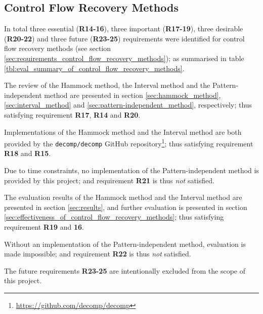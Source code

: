 
\subsection{Control Flow Recovery Methods}

In total three essential (\textbf{R14-16}), three important (\textbf{R17-19}), three desirable (\textbf{R20-22}) and three future (\textbf{R23-25}) requirements were identified for control flow recovery methods (see section \ref{sec:requirements_control_flow_recovery_methods}); as summarised in table \ref{tbl:eval_summary_of_control_flow_recovery_methods}.

The review of the Hammock method, the Interval method and the Pattern-independent method are presented in section \ref{sec:hammock_method}, \ref{sec:interval_method} and \ref{sec:pattern-independent_method}, respectively; thus satisfying requirement \textbf{R17}, \textbf{R14} and \textbf{R20}.

Implementations of the Hammock method and the Interval method are both provided by the \texttt{decomp/decomp} GitHub repository\footnote{\url{https://github.com/decomp/decomp}}; thus satisfying requirement \textbf{R18} and \textbf{R15}.

Due to time constraints, no implementation of the Pattern-independent method is provided by this project; and requirement \textbf{R21} is thus \textit{not} satisfied.

The evaluation results of the Hammock method and the Interval method are presented in section \ref{sec:results}, and further evaluation is presented in section \ref{sec:effectiveness_of_control_flow_recovery_methods}; thus satisfying requirement \textbf{R19} and \textbf{16}.

Without an implementation of the Pattern-independent method, evaluation is made impossible; and requirement \textbf{R22} is thus \textit{not} satisfied.

The future requirements \textbf{R23-25} are intentionally excluded from the scope of this project.

